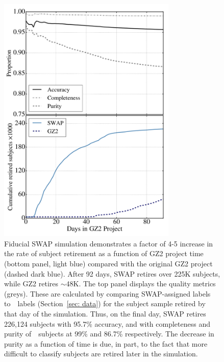 \begin{figure}[t!]
\includegraphics[width=3.35in]{Figures/human_machine/f3.pdf}
\caption[SWAP performance on Galaxy Zoo visual classifications.]{Fiducial SWAP simulation demonstrates a factor of 4-5 increase in the rate of subject retirement as a function of GZ2 project time (bottom panel, light blue) compared with the original GZ2 project (dashed dark blue). After 92 days, SWAP retires over 225K subjects, while GZ2 retires $\sim$48K.  The top panel displays the quality metrics (greys). These are calculated by comparing SWAP-assigned labels to~\raw~labels (Section~\ref{sec: data}) for the subject sample retired by that day of the simulation. Thus, on the final day, SWAP retires 226,124 subjects with 95.7\% accuracy,  and with completeness and purity of~\feat~subjects at 99\% and 86.7\% respectively. The decrease in purity as a function of time is due, in part, to the fact that more difficult to classify subjects are retired later in the simulation. 
\label{fig: fiducial run}}
\end{figure}



